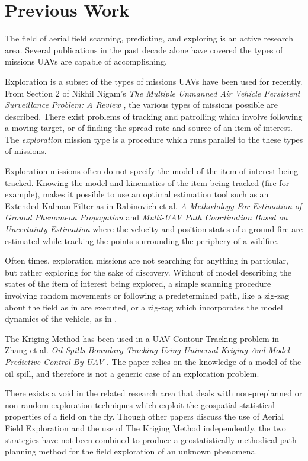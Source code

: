 
\chapter{Previous Work}
The field of aerial field scanning, predicting, and exploring is an active research area. Several publications in the past decade alone have covered the types of missions UAVs are capable of accomplishing.

Exploration is a subset of the types of missions UAVs have been used for recently. From Section 2 of Nikhil Nigam's \textit{The Multiple Unmanned Air Vehicle Persistent Surveillance Problem: A Review} \cite{nigam:missions}, the various types of missions possible are described. There exist problems of tracking and patrolling which involve following a moving target, or of finding the spread rate and source of an item of interest. The \textit{exploration} mission type is a procedure which runs parallel to the these types of missions. 

Exploration missions often do not specify the model of the item of interest being tracked. Knowing the model and kinematics of the item being tracked (fire for example), makes it possible to use an optimal estimation tool such as an Extended Kalman Filter as in Rabinovich et al. \textit{A Methodology For Estimation of Ground Phenomena Propagation} \cite{sharon:uav_est} and \textit{Multi-UAV Path Coordination Based on Uncertainty Estimation} \cite{sharon:uav_uncert} where the velocity and position states of a ground fire are estimated while tracking the points surrounding the periphery of a wildfire.

Often times, exploration missions are not searching for anything in particular, but rather exploring for the sake of discovery. Without of model describing the states of the item of interest being explored, a simple scanning procedure involving random movements or following a predetermined path, like a zig-zag about the field as in \cite{semsch:uav_zig} are executed, or a zig-zag which incorporates the model dynamics of the vehicle, as in \cite{nigam:zigzag}. 

The Kriging Method has been used in a UAV Contour Tracking problem in Zhang et al. \textit{Oil Spills Boundary Tracking Using Universal Kriging And Model Predictive Control By UAV} \cite{zhang:oil_krig}. The paper relies on the knowledge of a model of the oil spill, and therefore is not a generic case of an exploration problem. 

There exists a void in the related research area that deals with non-preplanned or non-random exploration techniques which exploit the geospatial statistical properties of a field on the fly. Though other papers discuss the use of Aerial Field Exploration and the use of The Kriging Method independently, the two strategies have not been combined to produce a geostatistically methodical path planning method for the field exploration of an unknown phenomena.